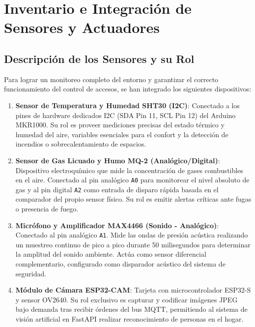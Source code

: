 \documentclass[12pt,letterpaper]{article}
\begin{document}
\section{Inventario e Integración de Sensores y Actuadores}

\subsection{Descripción de los Sensores y su Rol}
Para lograr un monitoreo completo del entorno y garantizar el correcto funcionamiento del control de accesos, se han integrado los siguientes dispositivos:
\begin{enumerate}
    \item \textbf{Sensor de Temperatura y Humedad SHT30 (I2C)}: Conectado a los pines de hardware dedicados I2C (SDA Pin 11, SCL Pin 12) del Arduino MKR1000. Su rol es proveer mediciones precisas del estado térmico y humedad del aire, variables esenciales para el confort y la detección de incendios o sobrecalentamiento de espacios.
    \item \textbf{Sensor de Gas Licuado y Humo MQ-2 (Analógico/Digital)}: Dispositivo electroquímico que mide la concentración de gases combustibles en el aire. Conectado al pin analógico \texttt{A0} para monitorear el nivel absoluto de gas y al pin digital \texttt{A2} como entrada de disparo rápida basada en el comparador del propio sensor físico. Su rol es emitir alertas críticas ante fugas o presencia de fuego.
    \item \textbf{Micrófono y Amplificador MAX4466 (Sonido - Analógico)}: Conectado al pin analógico \texttt{A1}. Mide las ondas de presión acústica realizando un muestreo continuo de pico a pico durante 50 milisegundos para determinar la amplitud del sonido ambiente. Actúa como sensor diferencial complementario, configurado como disparador acústico del sistema de seguridad.
    \item \textbf{Módulo de Cámara ESP32-CAM}: Tarjeta con microcontrolador ESP32-S y sensor OV2640. Su rol exclusivo es capturar y codificar imágenes JPEG bajo demanda tras recibir órdenes del bus MQTT, permitiendo al sistema de visión artificial en FastAPI realizar reconocimiento de personas en el hogar.
\end{enumerate}
\end{document}
